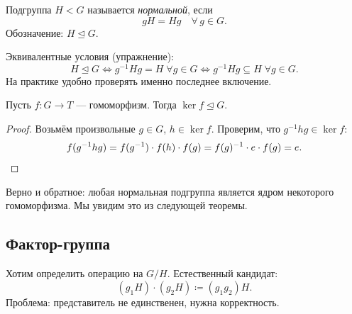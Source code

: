 \begin{definition}
    Подгруппа $H < G$ называется \emph{нормальной}, если
    \[
        gH = Hg \quad \forall\, g \in G.
    \]
    Обозначение: $H \trianglelefteq G$.

    Эквивалентные условия (упражнение):
    \[
        H \trianglelefteq G \iff g^{-1}Hg = H \;\forall g \in G \iff g^{-1}Hg \subseteq H \;\forall g \in G.
    \]
    На практике удобно проверять именно последнее включение.
\end{definition}

\begin{stmt}
    Пусть $f\colon G \to T$ --- гомоморфизм. Тогда $\ker f \trianglelefteq G$.

    \begin{proof}
        Возьмём произвольные $g \in G$, $h \in \ker f$. Проверим, что $g^{-1}hg \in \ker f$:
        \[
            f(g^{-1}hg) = f(g^{-1}) \cdot f(h) \cdot f(g) = f(g)^{-1} \cdot e \cdot f(g) = e. \qedhere
        \]
    \end{proof}
\end{stmt}

\begin{remark}
    Верно и обратное: любая нормальная подгруппа является ядром некоторого гомоморфизма. Мы увидим это из следующей теоремы.
\end{remark}



\subsection*{Фактор-группа}

Хотим определить операцию на $G/H$. Естественный кандидат:
\[
    (g_1 H) \cdot (g_2 H) \coloneqq (g_1 g_2) H. \tag{$*$}
\]
Проблема: представитель не единственен, нужна корректность.

